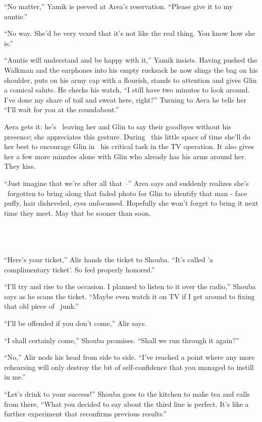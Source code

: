 \documentclass[twoside,11pt]{book}
\begin{document}
``No matter,'' Yamik is peeved at Area's reservation. ``Please give it to my
auntie.''

``No way. She'd be very vexed that it's not like the real thing. You know how she is.''

``Auntie will understand and be happy with it,'' Yamik insists. Having pushed the Walkman and
the earphones into his empty rucksack he now slings the bag on his shoulder, puts on his army cap with a flourish,
stands to attention and gives Glin a comical salute. He checks his watch, ``I still have two minutes to
look around. I've done my share of toil and sweat here, right?'' Turning to Aera he tells her ``I'll wait
for you at the roundabout.''

Aera gets it: he's \ leaving her and Glin to say their goodbyes without his presence; she appreciates this gesture.
During \ this little space of time she'll do her best to encourage Glin in \ his critical task in the TV operation. It
also gives her a few more minutes alone with Glin who already has his arms around her. They kiss.

``Just imagine that we're after all that --'' Area says and suddenly realizes she's
\ forgotten to bring along that faded photo for Glin to identify that man - face puffy, hair disheveled, eyes
unfocussed. Hopefully she won't forget to bring it next time they meet. May that be sooner than soon.

~

\chapter{}

``Here's your ticket,'' Alir hands the ticket to Shouba. ``It's called 'a
complimentary ticket'. So feel properly honored.''

``I'll try and rise to the occasion. I planned to listen to it over the radio,'' Shouba says
as he scans the ticket. ``Maybe even watch it on TV if I get around to fixing that old piece of
~junk.''

``I'll be offended if you don't come,'' Alir says.

``I shall certainly come,'' Shouba promises. ``Shall we run through it
again?''

``No,'' Alir nods his head from side to side. ``I've reached a point where any
more rehearsing will only destroy the bit of self-confidence that you managed to instill in me.''

``Let's drink to your success!'' Shouba goes to the kitchen to make tea and calls from there,
``What you decided to say about the third line is perfect. It's like a further experiment that reconfirms
previous results.''
\end{document}
